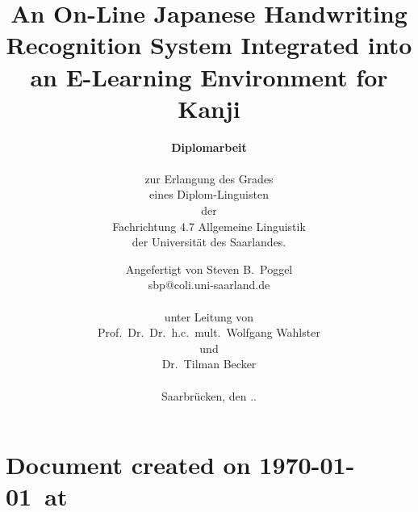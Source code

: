\documentclass[a4paper]{book}
\title{An On-Line Japanese Handwriting Recognition System Integrated into an E-Learning Environment for Kanji}
\author{\textbf{\large Diplomarbeit} \\
\textsc{ } \\
zur Erlangung des Grades \\
eines Diplom-Linguisten\\
der \\
Fachrichtung 4.7 Allgemeine Linguistik \\ 
der Universität des Saarlandes.}
\date{
Angefertigt von
Steven B.~Poggel\\
sbp@coli.uni-saarland.de \\
\textsc{ } \\
unter Leitung von \\
Prof.~Dr.~Dr.~h.c.~mult.~Wolfgang Wahlster \\
und \\
Dr.~Tilman Becker \\
\textsc{ } \\
Saarbrücken, den \the\day.\the\month.\the\year}
\begin{document}



% 
\chapter*{Document created on \today~at \xxivtime}
\end{document}

